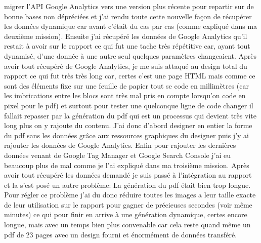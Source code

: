 \documentclass[12pt]{article}
\begin{document}
 migrer l'API Google Analytics vers une version plus récente pour repartir sur de bonne bases non dépréciées et j'ai rendu toute cette nouvelle façon de récupérer les données dynamique car avant c'était du cas par cas (comme expliqué dans ma deuxième mission). Ensuite j'ai récupéré les données de Google Analytics qu'il restait à avoir sur le rapport ce qui fut une tache très répétitive car, ayant tout dynamisé, d'une donnée à une autre seul quelques paramètres changeaient. Après avoir tout récupéré de Google Analytics, je me suis attaqué au design total du rapport ce qui fut très très long car, certes c'est une page HTML mais comme ce sont des éléments fixe sur une feuille de papier tout se code en millimètres (car les imbrications entre les blocs sont très mal pris en compte lorsqu'on code en pixel pour le pdf) et surtout pour tester une quelconque ligne de code changer il fallait repasser par la génération du pdf qui est un processus qui devient très vite long plus on y rajoute du contenu. J'ai donc d'abord designer en entier la forme du pdf sans les données grâce aux ressources graphiques du designer puis j'y ai rajouter les données de Google Analytics. Enfin pour rajouter les dernières données venant de Google Tag Manager et Google Search Console j'ai eu beaucoup plus de mal comme je l'ai expliqué dans ma troisième mission. Après avoir tout récupéré les données demandé je suis passé à l'intégration au rapport et la s'est posé un autre problème: La génération du pdf était bien trop longue. Pour régler ce problème j'ai du donc réduire toutes les images a leur taille exacte de leur utilisation sur le rapport pour gagner de précieuses secondes (voir même minutes) ce qui pour finir en arrive à une génération dynamique, certes encore longue, mais avec un temps bien plus convenable car cela reste quand même un pdf de 23 pages avec un design fourni et énormément de données transféré.
\end{document}
